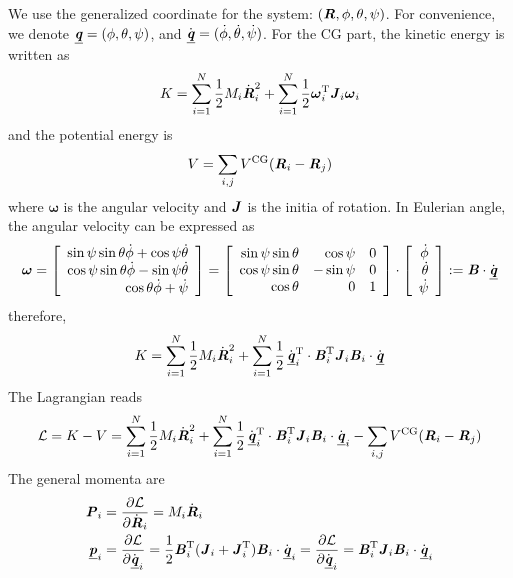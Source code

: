 \documentclass[aip,jcp,a4paper,reprint,onecolumn]{revtex4-1}
\newcommand{\vect}[1]{\textbf{\textit{#1}}}
\newcommand{\CG}{{\textrm{CG}}}
\newcommand{\trans}{\textrm{T}}
\newcommand{\dgenq}{\dot{\underline{\vect q}}}
\newcommand{\genq}{{\underline{\vect q}}}
\newcommand{\genp}{{\underline{\vect p}}}
\begin{document}
We use the generalized coordinate for the system: $(\vect R, \phi,
\theta, \psi)$. For convenience, we denote $\genq = (\phi,
\theta, \psi)$, and $\dgenq = (\dot\phi,
\dot\theta, \dot\psi)$.  For the CG part, the kinetic energy
is written as
\begin{align}
  K =
  \sum_{i=1}^N\frac 12 M_i\dot{\vect R}_i^2 +
  \sum_{i=1}^N\frac 12 \boldsymbol\omega^\trans_i \vect J_i\boldsymbol\omega_i
\end{align}
and the potential energy is
\begin{align}
  V = \sum_{i,j} V^\CG(\vect R_i - \vect R_j)
\end{align}
where $\boldsymbol\omega$ is the angular velocity and $\vect J$ is the
initia of rotation. In Eulerian angle, the angular velocity can be expressed
as
\begin{align}
  \boldsymbol\omega =
  \left[
    \begin{array}{r}
      \sin\psi \sin\theta \dot\phi + \cos\psi \dot\theta\\
      \cos\psi \sin\theta \dot\phi - \sin\psi \dot\theta\\
      \cos\theta \dot\phi + \dot\psi
    \end{array}
  \right]
  =
  \left[
    \begin{array}{rrr}
      \sin\psi \sin\theta &  \cos\psi & 0 \\
      \cos\psi \sin\theta & -\sin\psi & 0 \\
      \cos\theta & 0 & 1
    \end{array}
  \right]
  \cdot
  \left[
    \begin{array}{r}
      \dot\phi\\
      \dot\theta\\
      \dot\psi
    \end{array}
  \right]
  :=
  \vect B \cdot \dgenq
\end{align}
therefore,
\begin{align}
  K = 
  \sum_{i=1}^N\frac 12 M_i\dot{\vect R}_i^2 +
  \sum_{i=1}^N\frac 12\,
  \dgenq_i^\trans \cdot\vect B_i^\trans \vect J_i \vect B_i\cdot\dgenq
\end{align}
The Lagrangian reads
\begin{align}
  \mathcal L = K - V = 
  \sum_{i=1}^N\frac 12 M_i\dot{\vect R}_i^2 +
  \sum_{i=1}^N\frac 12\,
  \dgenq_i^\trans \cdot\vect B_i^\trans \vect J_i \vect B_i\cdot\dgenq_i
  -
  \sum_{i,j} V^\CG(\vect R_i - \vect R_j)
\end{align}
The general momenta are
\begin{align}
  \vect P_i & =
  \frac{\partial \mathcal L}{\partial \dot {\vect R}_i} =
  M_i \dot {\vect R}_i \\
  \genp_i & =
  \frac{\partial \mathcal L}{\partial \dgenq_i} =
  \frac12 \vect B_i^\trans (\vect J_i + \vect J_i^\trans) \vect B_i\cdot\dgenq_i
  =
  \frac{\partial \mathcal L}{\partial \dgenq_i} =
  \vect B_i^\trans \vect J_i  \vect B_i\cdot\dgenq_i
\end{align}
\end{document}
